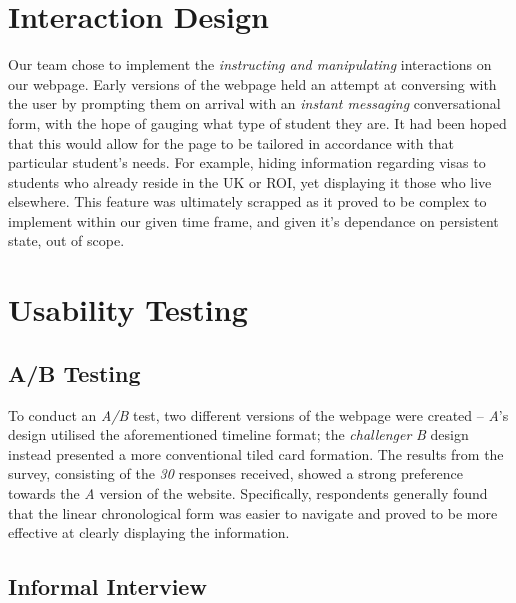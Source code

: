 \documentclass[a4paper, notoc]{tufte-handout}
\begin{document}
%

\section{Interaction Design}\label{label:interaction-design}

Our team chose to implement the \textit{instructing and manipulating} interactions on our webpage. Early versions of the webpage held an attempt at conversing with the user by prompting them on arrival with an \textit{instant messaging} conversational form, with the hope of gauging what type of student they are. It had been hoped that this would allow for the page to be tailored in accordance with that particular student's needs. For example, hiding information regarding visas to students who already reside in the UK or ROI, yet displaying it those who live elsewhere. This feature was ultimately scrapped as it proved to be complex to implement within our given time frame, and given it's dependance on persistent state, out of scope.


\section{Usability Testing}\label{sec:usability-testing}

\subsection{A/B Testing}\label{subsec:a-b-testing}

To conduct an \textit{A/B} test, two different versions of the webpage were created -- \textit{A}'s design utilised the aforementioned timeline format; the \textit{challenger} \textit{B} design instead presented a more conventional tiled card formation. The results from the survey, consisting of the \emph{30} responses received, showed a strong preference towards the \textit{A} version of the website. Specifically, respondents generally found that the linear chronological form was easier to navigate and proved to be more effective at clearly displaying the information.

\subsection{Informal Interview}\label{subsec:interview}
\end{document}

